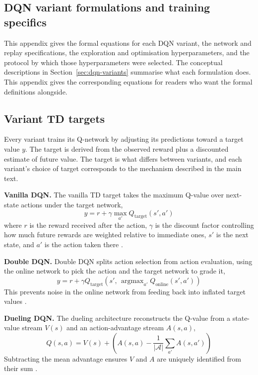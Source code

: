 \begin{appendices}
\chapter{DQN variant formulations and training specifics}
\label{appendix:dqn-specifics}

This appendix gives the formal equations for each DQN variant, the network and replay specifications, the exploration and optimisation hyperparameters, and the protocol by which those hyperparameters were selected. The conceptual descriptions in Section~\ref{sec:dqn-variants} summarise what each formulation does. This appendix gives the corresponding equations for readers who want the formal definitions alongside.


\section{Variant TD targets}

Every variant trains its Q-network by adjusting its predictions toward a target value $y$. The target is derived from the observed reward plus a discounted estimate of future value. The target is what differs between variants, and each variant's choice of target corresponds to the mechanism described in the main text.

\textbf{Vanilla DQN.} The vanilla TD target takes the maximum Q-value over next-state actions under the target network,
\[
y = r + \gamma \max_{a'} Q_{\text{target}}(s', a')
\]
where $r$ is the reward received after the action, $\gamma$ is the discount factor controlling how much future rewards are weighted relative to immediate ones, $s'$ is the next state, and $a'$ is the action taken there \citep{mnih2015human}.

\textbf{Double DQN.} Double DQN splits action selection from action evaluation, using the online network to pick the action and the target network to grade it,
\[
y = r + \gamma Q_{\text{target}}\!\left(s',\, \mathop{\arg\max}_{a'} Q_{\text{online}}(s', a')\right)
\]
This prevents noise in the online network from feeding back into inflated target values \citep{vanhasselt2016double}.

\textbf{Dueling DQN.} The dueling architecture reconstructs the Q-value from a state-value stream $V(s)$ and an action-advantage stream $A(s,a)$,
\[
Q(s,a) = V(s) + \left(A(s,a) - \frac{1}{|\mathcal{A}|}\sum_{a'} A(s,a')\right)
\]
Subtracting the mean advantage ensures $V$ and $A$ are uniquely identified from their sum \citep{wang2016dueling}.


\end{appendices}
